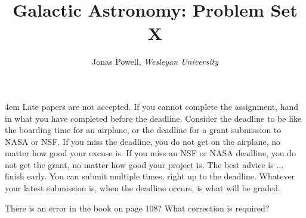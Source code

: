 \documentclass[12pt]{article}
\newenvironment{problem}[2][Problem]{\begin{trivlist}
\item[\hskip \labelsep {\bfseries #1}\hskip \labelsep {\bfseries #2.}]}{\end{trivlist}}
\newenvironment{answer}[2][Answer]{\begin{trivlist}
\item[\hskip \labelsep {\bfseries #1}\hskip \labelsep {\bfseries #2.}]}{\end{trivlist}}
\begin{document}



\title{\Large \textbf{Galactic Astronomy: Problem Set X}}

\author{{\rm Jonas Powell, \textit{Wesleyan University}}}


\maketitle


\begin{addmargin}[4em]{4em}
 Late papers are not accepted. If you cannot complete the assignment, hand in what you have completed before the deadline. Consider the deadline to be like the boarding time for an airplane, or the deadline for a grant submission to NASA or NSF. If you miss the deadline, you do not get on the airplane, no matter how good your excuse is. If you miss an NSF or NASA deadline, you do not get the grant, no matter how good your project is. The best advice is ... finish early. You can submit multiple times, right up to the deadline. Whatever your latest submission is, when the deadline occurs, is what will be graded.
\bigskip \bigskip
\end{addmargin}




\begin{problem}{1}
  There is an error in the book on page 108? What correction is required?
\end{problem}

\begin{answer}{1}
\end{answer}
\end{document}

